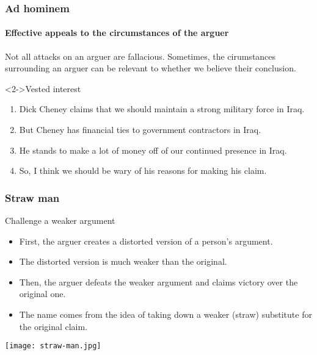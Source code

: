\documentclass[10pt,letterpaper,xcolor=dvipsnames,handout]{beamer}
\begin{document}
\begin{frame}
  \frametitle{Ad hominem}
  \framesubtitle{Effective appeals to the circumstances of the arguer}
  
  Not all attacks on an arguer are fallacious.  Sometimes, the cirumstances surrounding an arguer can be relevant to whether we believe their conclusion.
  
  \begin{block}<2->{Vested interest}
    \begin{enumerate}
      \item Dick Cheney claims that we should maintain a strong military force in Iraq.
      \item But Cheney has financial ties to government contractors in Iraq.
      \item He stands to make a lot of money off of our continued presence in Iraq.
      \item So, I think we should be wary of his reasons for making his claim.
    \end{enumerate}
  \end{block}
  
  
\end{frame}

\begin{frame}
  \frametitle{Straw man}
  
  \begin{block}{Challenge a weaker argument}
    \begin{itemize}
      \item First, the arguer creates a distorted version of a person's argument.
      \item The distorted version is much weaker than the original.
      \item Then, the arguer defeats the weaker argument and claims victory over the original one.
      \item The name comes from the idea of taking down a weaker (straw) substitute for the original claim.
    \end{itemize}
  \end{block}
  
  \begin{center}
    \texttt{[image: straw-man.jpg]}
  \end{center}
  
\end{frame}
\end{document}
